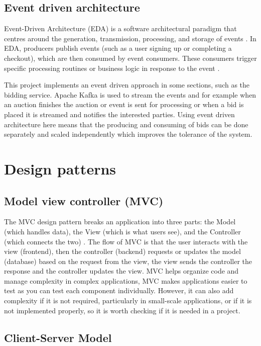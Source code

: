 \documentclass[]{project_report}
\begin{document}
\subsection{Event driven architecture}

Event-Driven Architecture (EDA) is a software architectural paradigm that centres around the generation, transmission, processing, and storage of events \cite{event_driven_architecture}. In EDA, producers publish events (such as a user signing up or completing a checkout), which are then consumed by event consumers. These consumers trigger specific processing routines or business logic in response to the event \cite{event_driven_architecture}. 

This project implements an event driven approach in some sections, such as the bidding service. Apache Kafka is used to stream the events and for example when an auction finishes the auction or event is sent for processing or when a bid is placed it is streamed and notifies the interested parties. Using event driven architecture here means that the producing and consuming of bids can be done separately and scaled independently which improves the tolerance of the system.

\section{Design patterns}

\subsection{Model view controller (MVC)}

The MVC design pattern breaks an application into three parts: the Model (which handles data), the View (which is what users see), and the Controller (which connects the two) \cite{mvc}. The flow of MVC is that the user interacts with the view (frontend), then the controller (backend) requests or updates the model (database) based on the request from the view, the view sends the controller the response and the controller updates the view. MVC helps organize code and manage complexity \cite{mvc} in complex applications, MVC makes applications easier to test as you can test each component individually. However, it can also add complexity if it is not required, particularly in small-scale applications, or if it is not implemented properly, so it is worth checking if it is needed in a project.

\subsection{Client-Server Model}
\end{document}
